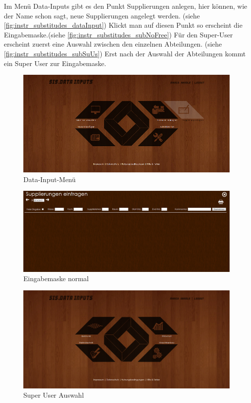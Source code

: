 Im Menü Data-Inputs gibt es den Punkt Supplierungen anlegen, hier können, wie der Name schon sagt, neue Supplierungen angelegt werden. (siehe \autoref{fig:instr_substitudes_dataInput}) Klickt man auf diesen Punkt so erscheint die Eingabemaske.(siehe \autoref{fig:instr_substitudes_subNoFree}) Für den Super-User erscheint zuerst eine Auswahl zwischen den einzelnen Abteilungen. (siehe \autoref{fig:instr_substitudes_subSuUs}) Erst nach der Auswahl der Abteilungen kommt ein Super User zur Eingabemaske.\\
\begin{figure}[H]
\centering
\includegraphics[keepaspectratio=true, width=17cm]{images/screenshots/data-inputs_substitudes.png}
\caption{Data-Input-Menü}
\label{fig:instr_substitudes_dataInput}
\end{figure}
\begin{figure}[H]
\centering
\includegraphics[keepaspectratio=true, width=17cm]{images/screenshots/substitudes_nofree.png}
\caption{Eingabemaske normal}
\label{fig:instr_substitudes_subNoFree}
\end{figure}
\begin{figure}[H]
\centering
\includegraphics[keepaspectratio=true, width=17cm]{images/screenshots/substitudes_sections.png}
\caption{Super User Auswahl}
\label{fig:instr_substitudes_subSuUs}
\end{figure}
